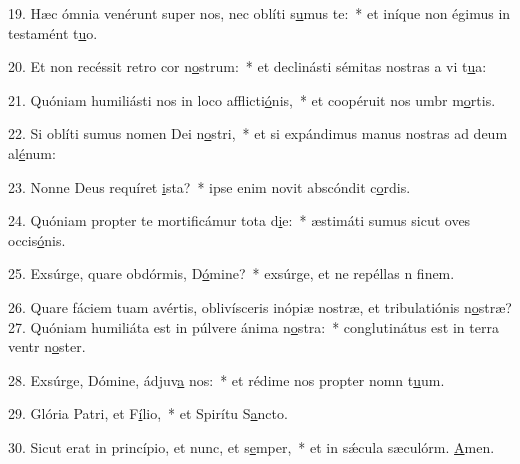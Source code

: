 19. Hæc ómnia venérunt super nos, nec oblíti s\uline{u}mus te:~* et iníque non égimus in testamént t\uline{u}o.\par 
20. Et non recéssit retro cor n\uline{o}strum:~* et declinásti sémitas nostras a vi t\uline{u}a:\par 
21. Quóniam humiliásti nos in loco afflicti\uline{ó}nis,~* et coopéruit nos umbr m\uline{o}rtis.\par 
22. Si oblíti sumus nomen Dei n\uline{o}stri,~* et si expándimus manus nostras ad deum al\uline{é}num:\par 
23. Nonne Deus requíret \uline{i}sta?~* ipse enim novit abscóndit c\uline{o}rdis.\par 
24. Quóniam propter te mortificámur tota d\uline{i}e:~* æstimáti sumus sicut oves occis\uline{ó}nis.\par 
25. Exsúrge, quare obdórmis, D\uline{ó}mine?~* exsúrge, et ne repéllas n f\uline{i}nem.\par 
26. Quare fáciem tuam avértis, oblivísceris inópiæ nostræ, et tribulatiónis n\uline{o}stræ?
27. Quóniam humiliáta est in púlvere ánima n\uline{o}stra:~* conglutinátus est in terra ventr n\uline{o}ster.\par 
28. Exsúrge, Dómine, ádjuv\uline{a} nos:~* et rédime nos propter nomn t\uline{u}um.\par 
29. Glória Patri, et F\uline{í}lio,~* et Spirítu S\uline{a}ncto.\par 
30. Sicut erat in princípio, et nunc, et s\uline{e}mper,~* et in sǽcula sæculórm. \uline{A}men.\par 

